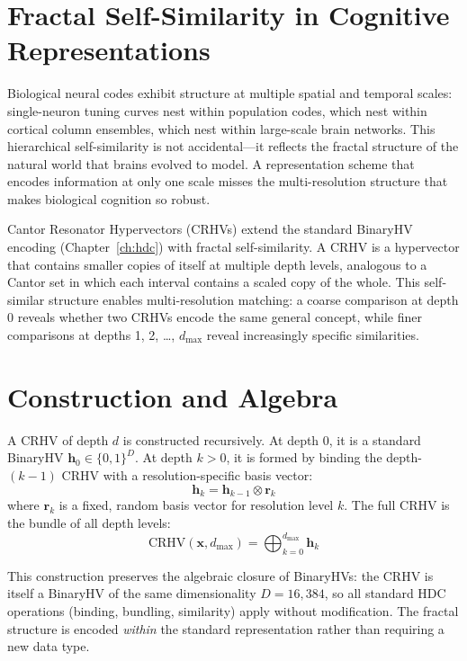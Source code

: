 \documentclass[12pt]{book}
\newcommand{\bind}{\otimes}
\newcommand{\dimHDC}{16{,}384}
\begin{document}
\section{Fractal Self-Similarity in Cognitive Representations}

Biological neural codes exhibit structure at multiple spatial and temporal scales: single-neuron tuning curves nest within population codes, which nest within cortical column ensembles, which nest within large-scale brain networks. This hierarchical self-similarity is not accidental---it reflects the fractal structure of the natural world that brains evolved to model. A representation scheme that encodes information at only one scale misses the multi-resolution structure that makes biological cognition so robust.

Cantor Resonator Hypervectors (CRHVs) extend the standard BinaryHV encoding (Chapter~\ref{ch:hdc}) with fractal self-similarity. A CRHV is a hypervector that contains smaller copies of itself at multiple depth levels, analogous to a Cantor set in which each interval contains a scaled copy of the whole. This self-similar structure enables multi-resolution matching: a coarse comparison at depth 0 reveals whether two CRHVs encode the same general concept, while finer comparisons at depths 1, 2, \ldots, $d_{\max}$ reveal increasingly specific similarities.

\section{Construction and Algebra}

A CRHV of depth $d$ is constructed recursively. At depth 0, it is a standard BinaryHV $\mathbf{h}_0 \in \{0,1\}^D$. At depth $k > 0$, it is formed by binding the depth-$(k-1)$ CRHV with a resolution-specific basis vector:
\begin{equation}
\mathbf{h}_k = \mathbf{h}_{k-1} \bind \mathbf{r}_k
\end{equation}
where $\mathbf{r}_k$ is a fixed, random basis vector for resolution level $k$. The full CRHV is the bundle of all depth levels:
\begin{equation}
\text{CRHV}(\mathbf{x}, d_{\max}) = \bigoplus_{k=0}^{d_{\max}} \mathbf{h}_k
\end{equation}

This construction preserves the algebraic closure of BinaryHVs: the CRHV is itself a BinaryHV of the same dimensionality $D = \dimHDC$, so all standard HDC operations (binding, bundling, similarity) apply without modification. The fractal structure is encoded \textit{within} the standard representation rather than requiring a new data type.
\end{document}
